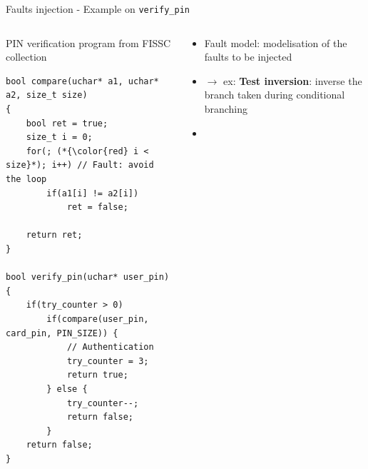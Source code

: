 \begin{frame}[fragile]{Faults injection - Example on \texttt{verify\_pin}}
    \begin{columns}
        \begin{column}{0.55\textwidth}
            \begin{small}
                PIN verification program from FISSC \cite{Dureuil/PPLCC16} collection                
            \end{small}
            
            \vspace{0.2cm}
            
            \begin{lstlisting}
bool compare(uchar* a1, uchar* a2, size_t size)
{
    bool ret = true;
    size_t i = 0; 
    for(; (*{\color{red} i < size}*); i++) // Fault: avoid the loop
        if(a1[i] != a2[i])
            ret = false;
        
    return ret;
}

bool verify_pin(uchar* user_pin) {
    if(try_counter > 0)  
        if(compare(user_pin, card_pin, PIN_SIZE)) {
            // Authentication
            try_counter = 3;
            return true;
        } else {
            try_counter--;
            return false;
        }
    return false;
}
            \end{lstlisting}	
        	\vfill
        \end{column}
        \begin{column}{0.45\textwidth}
        	\begin{small}
                 \begin{itemize}
                     \item Fault model: modelisation of the faults to be injected
                     \item[] $\rightarrow$ ex: \textbf{Test inversion}: inverse the branch taken during conditional branching
                     \item[]
                 \end{itemize}
    	    \end{small}
            \vfill
        \end{column}
    \end{columns}
\end{frame}

